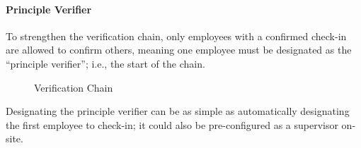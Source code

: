 \paragraph{Principle Verifier}

To strengthen the verification chain, only employees with a
confirmed check-in are allowed to confirm others, meaning
one employee must be designated as the \enquote{principle
  verifier}; i.e., the start of the chain.

\begin{figure}[h]
  \centering
  

  \caption{Verification Chain}
  \label{fig:verificationTree}
\end{figure}

Designating the principle verifier can be as simple as
automatically designating the first employee to check-in;
it could also be pre-configured as a supervisor on-site.



